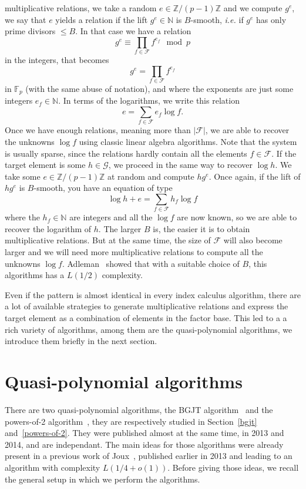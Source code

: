 \documentclass[a4paper,11pt]{article}
\theoremstyle{break}
\theoremstyle{sc}
\theoremstyle{definition}
\theoremstyle{remark}
\newcommand{\ie}{\emph{i.e. }}
\begin{document}
multiplicative relations, we take a random $e\in\mathbb{Z}/(p-1)\mathbb{Z}$ and
we compute $g^e$, we say that $e$ yields a relation if the lift
$g^e\in\mathbb{N}$ is $B$-smooth, \ie if $g^e$ has only prime divisors $\leq B$.
In that case we have a relation 
\[ 
  g^e \equiv \prod_{f\in \mathcal F}f^{e_f} \mod p
\]
in the integers, that becomes 
\[ 
  g^e = \prod_{f\in \mathcal F}f^{e_f}
\]
in $\mathbb{F}_p$ (with the same abuse of notation), and where the exponents are
just some integers $e_f\in\mathbb{N}$. In terms of the logarithms, we write this
relation
\[
  e = \sum_{f\in\mathcal F} e_f\log f.
\]
Once we have enough relations, meaning more than $|\mathcal F|$, we are able to
recover the unknowns $\log f$ using classic linear algebra algorithms. Note that
the system is usually sparse, since the relations hardly contain all the
elements $f\in\mathcal F$. If the target element is some $h\in\mathcal G$, we
proceed in the same way to recover $\log h$. We take some
$e\in\mathbb{Z}/(p-1)\mathbb{Z}$ at random and compute $hg^e$. Once again, if
the lift of $hg^e$ is $B$-smooth, you have an equation of type
\[
  \log h + e = \sum_{f\in\mathcal F}h_f\log f
\]
where the $h_f\in\mathbb{N}$ are integers and all the $\log f$ are now known, so
we are able to recover the logarithm of $h$. The larger $B$ is, the easier it is
to obtain multiplicative relations. But at the same time, the size of $\mathcal
F$ will also become larger and we will need more multiplicative relations to
compute all the unknowns $\log f$. Adleman~\cite{Adleman79} showed that with a suitable choice of
$B$, this algorithms has a $L(1/2)$ complexity.

Even if the pattern is almost identical in every index calculus algorithm, there
are a lot of available strategies to generate multiplicative relations and
express the target element as a combination of elements in the factor base. This
led to a a rich variety of algorithms, among them are the quasi-polynomial
algorithms, we introduce them briefly in the next section.

\section{Quasi-polynomial algorithms}
\label{quasi-pol}

There are two quasi-polynomial algorithms, the BGJT algorithm~\cite{BGJT13} and
the powers-of-2 algorithm~\cite{GKZ14}, they are respectively studied in
Section~\ref{bgjt} and~\ref{powers-of-2}. They were published almost at the
same time, in 2013 and 2014, and are independant. 
The main ideas for those algorithms were already present in a
previous work of Joux~\cite{Joux13}, published earlier in 2013 and leading to
an algorithm with complexity $L(1/4 + o(1))$. Before giving those ideas, we
recall the general setup in which we perform the algorithms.
\end{document}
